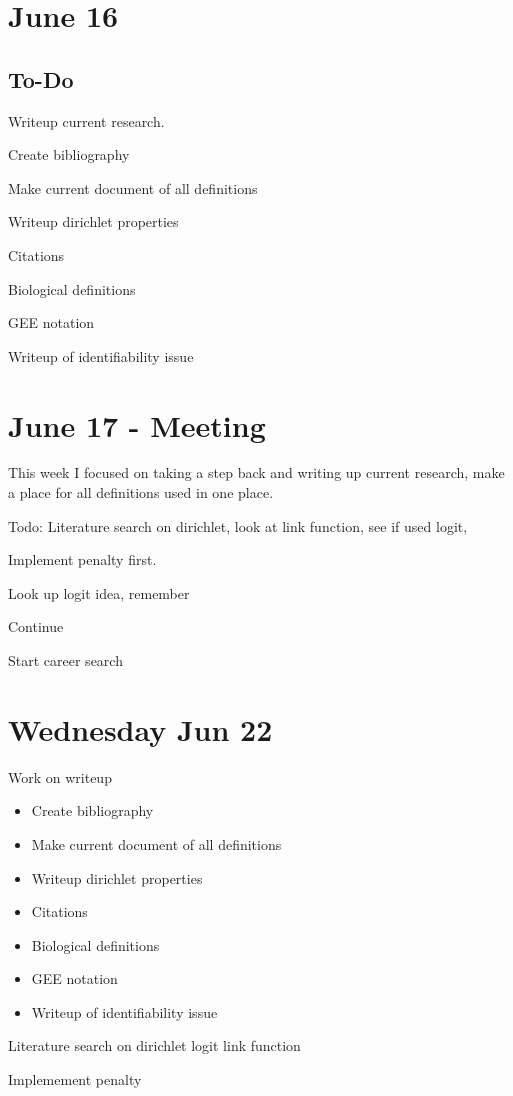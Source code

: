 \documentclass[10pt]{article}
\theoremstyle{definition}
\begin{document}
\section{June 16}



\subsection{To-Do}
\begin{todolist}
  \item Writeup current research.
  \item Create bibliography
  \item Make current document of all definitions
  \item Writeup dirichlet properties
  \item Citations
  \item Biological definitions
  \item GEE notation
  \item Writeup of identifiability issue
\end{todolist}






\newpage
\section{June 17 - Meeting}

This week I focused on taking a step back and writing up current research, make a place for all definitions used in one place.

Todo:
Literature search on dirichlet, look at link function, see if used logit,

Implement penalty first.

Look up logit idea, remember

Continue

Start career search

\section{Wednesday Jun 22}


\begin{todolist}
  \item Work on writeup
  \begin{itemize}
      \item Create bibliography
      \item Make current document of all definitions
      \item Writeup dirichlet properties
      \item Citations
      \item Biological definitions
      \item GEE notation
      \item Writeup of identifiability issue
  \end{itemize}
  \item Literature search on dirichlet logit link function
  \item Implemement penalty

\end{todolist}
\end{document}
